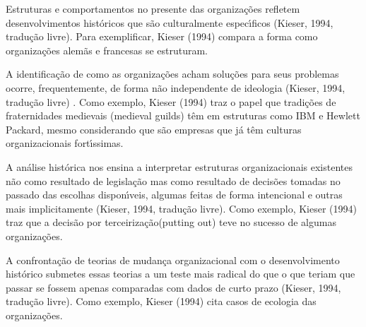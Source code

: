 \documentclass[
12pt,		%
openright,	%
twoside,  %
a4paper,			%
chapter=TITLE,		%
english,			%
french,				%
spanish,			%
brazil				%
]{USPSC-classe/USPSC}
\begin{document}
\begin{alineas}
\item Estruturas e comportamentos no presente das organiza\c{c}\~oes refletem desenvolvimentos hist\'oricos que s\~ao culturalmente espec\'{\i}ficos  (Kieser, 1994, tradu\c{c}\~ao livre). Para exemplificar,  Kieser (1994) compara a forma como organiza\c{c}\~oes alem\~as e francesas se estruturam.
\item A identifica\c{c}\~ao de como as organiza\c{c}\~oes acham solu\c{c}\~oes para seus problemas ocorre, frequentemente, de forma n\~ao independente de ideologia  (Kieser, 1994, tradu\c{c}\~ao livre) . Como exemplo,  Kieser (1994) traz o papel  que tradi\c{c}\~oes de fraternidades medievais (medieval guilds) t\^em em estruturas como IBM e Hewlett Packard, mesmo considerando que s\~ao empresas que j\'a t\^em culturas organizacionais fort\'{\i}ssimas.
\item A an\'alise hist\'orica nos ensina a interpretar estruturas organizacionais existentes n\~ao como resultado de legisla\c{c}\~ao mas como resultado de decis\~oes tomadas no passado das escolhas dispon\'{\i}veis, algumas feitas de forma intencional e outras mais implicitamente  (Kieser, 1994, tradu\c{c}\~ao livre). Como exemplo,  Kieser (1994) traz que a decis\~ao por \textquotedbl terceiriza\c{c}\~ao\textquotedbl  (putting out) teve no sucesso de algumas organiza\c{c}\~oes.
\item A confronta\c{c}\~ao de teorias de mudan\c{c}a organizacional com o desenvolvimento hist\'orico submetes essas teorias a um teste mais radical do que o que teriam que passar se fossem apenas comparadas com dados de curto prazo (Kieser, 1994, tradu\c{c}\~ao livre). Como exemplo,  Kieser (1994) cita casos de ecologia das organiza\c{c}\~oes.
\end{alineas}
\end{document}
